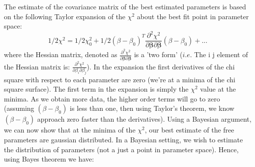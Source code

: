 The estimate of the covariance matrix of the best estimated parameters is based on the following Taylor expansion of the $\chi^2$ about the best fit point in parameter space:
\begin{equation}
 1/2\chi^2 = 1/2\chi_0^2 + 1/2(\beta-\beta_0)^T \frac{\partial^2{\chi^2}}{\partial{\mathbf{\beta}}\partial{\mathbf{\beta}}}(\beta-\beta_0) + ...
 \end{equation} 
 where the Hessian matrix, denoted as $\frac{\partial^2{\chi^2}}{\partial{\mathbf{\beta}}\partial{\mathbf{\beta}}}$ is a 'two form' ($\textit{i.e.}$ The i j element of the Hessian matrix is: $\frac{\partial^2{\chi^2}}{\partial{\beta_i}\partial{\beta_j}}$).  In the expansion the first derivatives of the chi square with respect to each parameter are zero (we're at a minima of the chi square surface).  The first term in the expansion is simply the $\chi^2$ value at the minima.  As we obtain more data, the higher order terms will go to zero (assuming $(\beta-\beta_0)$ is less than one, then using Taylor's theorem, we know $(\beta-\beta_0)$ approach zero faster than the derivatives).  Using a Bayesian argument, we can now show that at the minima of the $\chi^2$, our best estimate of the free parameters are gaussian distributed.  In a Bayesian setting, we wish to estimate the distribution of parameters (not a just a point in parameter space).  Hence, using Bayes theorem we have:


